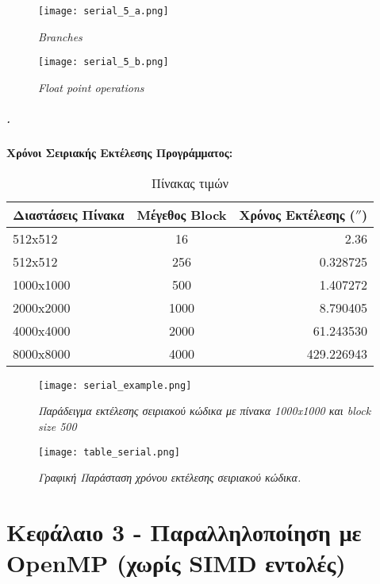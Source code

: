 \documentclass[greek,booktabs,8pt,flagBlueCMYK]{report}
\begin{document}
\begin{figure}[ht]
\centering
\texttt{[image: serial\_5\_a.png]}
\caption{\textit{Branches}}
\label{fig:5_a}
\end{figure}

\begin{figure}[ht]
\centering
\texttt{[image: serial\_5\_b.png]}
\caption{\textit{Float point operations}}
\label{fig:5_b}
\end{figure}

\clearpage

\paragraph{.} \textbf{Χρόνοι Σειριακής Εκτέλεσης Προγράμματος:}\newline

\begin{table}[H]
\begin{center}
\label{tab:3} 
\begin{tabular}{| l | c | r |}
  \hline
  Διαστάσεις Πίνακα & Μέγεθος Block & Χρόνος Εκτέλεσης ($''$)\\ \hline
  512x512 & 16 &  2.36\\ \hline 
  512x512 & 256 &  0.328725 \\ \hline
  1000x1000 & 500 &   1.407272\\ \hline
  2000x2000 & 1000 &  8.790405\\ \hline
  4000x4000 & 2000 &  61.243530\\ \hline
  8000x8000 & 4000 &  429.226943\\ \hline
\end{tabular}
\caption {Πίνακας τιμών}
\end{center}
\end{table}

\begin{figure}[ht]
\centering
\label{fig:serial_example}
\texttt{[image: serial\_example.png]}
\caption{\textit{Παράδειγμα εκτέλεσης σειριακού κώδικα με πίνακα 1000x1000 και block size 500}}
\end{figure}

\begin{figure}[ht]
\centering
\label{fig:table_serial}
\texttt{[image: table\_serial.png]}
\caption{\textit{Γραφική Παράσταση χρόνου εκτέλεσης σειριακού κώδικα.}}
\end{figure}


\clearpage
\chapter{Κεφάλαιο 3 - Παραλληλοποίηση με OpenMP (χωρίς SIMD εντολές)}
\end{document}
